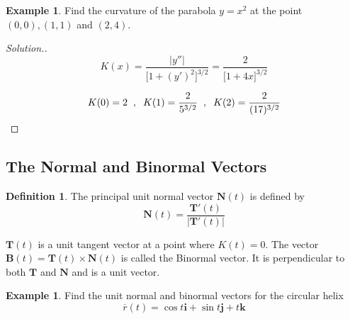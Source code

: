 \documentclass[11pt,a4paper]{article}
\theoremstyle{definition}
\newtheorem{defn}[thm]{Definition}
\newtheorem{exa}[thm]{Example}
\newenvironment{solution}
  {\renewcommand{\qedsymbol}{}\begin{proof}[\textit{Solution}.]}
  {\end{proof}}
\begin{document}
\begin{exa}


Find the curvature of the parabola $y = x^2$ at the point $(0,0), (1,1)$ and $(2,4)$.
\end{exa}


\begin{solution}
$$K(x) = \frac{\left|y''\right|
}{\Big[1 + (y')^2\Big]^{3/2}} = \frac{2}{\Big[1 + 4x\Big]^{3/2}}$$

$$K(0) = 2 \hspace{0.2cm},\hspace{0.2cm} K(1) = \frac{2}{5^{3/2}} \hspace{0.2cm},\hspace{0.2cm} K(2) = \frac{2}{(17)^{3/2}}$$
\end{solution}


\subsection{The Normal and Binormal Vectors}

\begin{defn}


The principal unit normal vector $\textbf{N}(t)$ is defined by $$\textbf{N}(t) = \frac{\textbf{T}'(t)}{\left|\textbf{T} '(t)\right|
}$$

$\textbf{T}(t)  $ is a unit tangent vector at a point where $K(t) = 0$. The vector $\textbf{B}(t) = \textbf{T}(t) \times \textbf{N}(t)$ is called the Binormal vector. It is perpendicular to both $\textbf{T}$ and $\textbf{N}$ and is a unit vector.
\end{defn}


\begin{exa}


Find the unit normal and binormal vectors for the circular helix $$\overline{r}(t) = \cos t \textbf{i} + \sin t \textbf{j} + t\textbf{k}$$
\end{exa}
\end{document}
